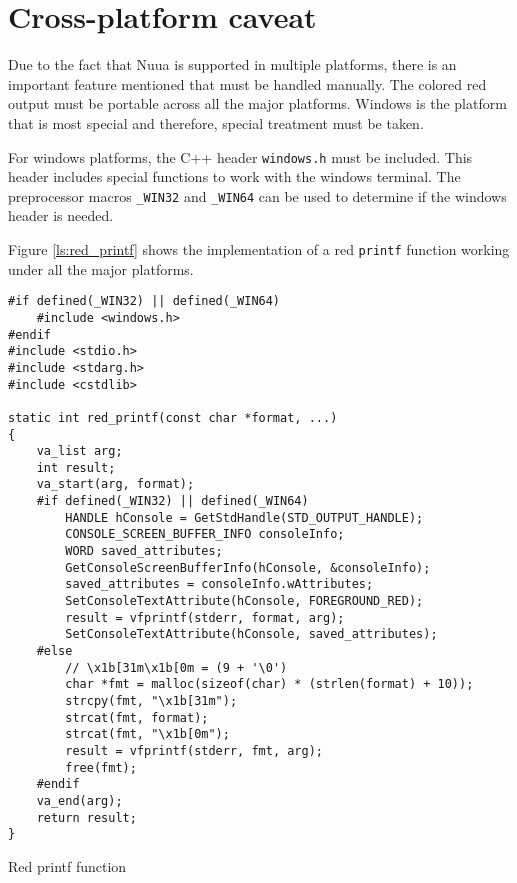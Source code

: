 \section{Cross-platform caveat}

Due to the fact that Nuua is supported in multiple platforms, there is an important feature mentioned that must be
handled manually. The colored red output must be portable across all the major platforms. Windows is the platform that
is most special and therefore, special treatment must be taken.

For windows platforms, the C++ header \texttt{windows.h} must be included.
This header includes special functions to work with the windows terminal. The preprocessor macros
\texttt{\_WIN32} and \texttt{\_WIN64} can be used to determine if the windows header is needed.

Figure \autoref{ls:red_printf} shows the implementation of a red \texttt{printf} function working under all the major
platforms.

\begin{listing}[H]
\begin{verbatim}
#if defined(_WIN32) || defined(_WIN64)
    #include <windows.h>
#endif
#include <stdio.h>
#include <stdarg.h>
#include <cstdlib>

static int red_printf(const char *format, ...)
{
    va_list arg;
    int result;
    va_start(arg, format);
    #if defined(_WIN32) || defined(_WIN64)
        HANDLE hConsole = GetStdHandle(STD_OUTPUT_HANDLE);
        CONSOLE_SCREEN_BUFFER_INFO consoleInfo;
        WORD saved_attributes;
        GetConsoleScreenBufferInfo(hConsole, &consoleInfo);
        saved_attributes = consoleInfo.wAttributes;
        SetConsoleTextAttribute(hConsole, FOREGROUND_RED);
        result = vfprintf(stderr, format, arg);
        SetConsoleTextAttribute(hConsole, saved_attributes);
    #else
        // \x1b[31m\x1b[0m = (9 + '\0')
        char *fmt = malloc(sizeof(char) * (strlen(format) + 10));
        strcpy(fmt, "\x1b[31m");
        strcat(fmt, format);
        strcat(fmt, "\x1b[0m");
        result = vfprintf(stderr, fmt, arg);
        free(fmt);
    #endif
    va_end(arg);
    return result;
}
\end{verbatim}
\caption{Red printf function}
\label{ls:red_printf}
\end{listing}
